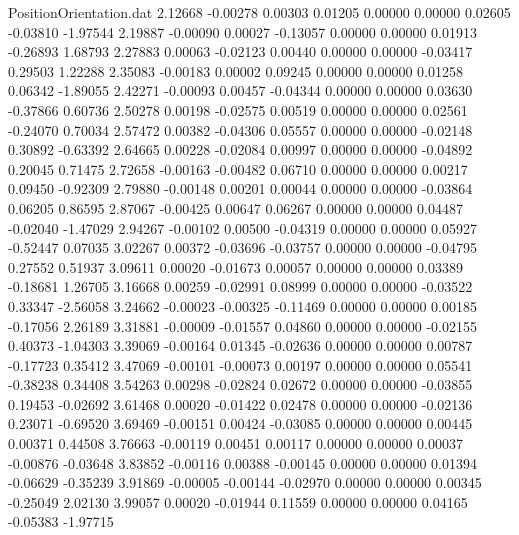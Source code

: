 \begin{filecontents}{PositionOrientation.dat}
   2.12668   -0.00278    0.00303     0.01205    0.00000    0.00000    0.02605   -0.03810   -1.97544
   2.19887   -0.00090    0.00027    -0.13057    0.00000    0.00000    0.01913   -0.26893    1.68793
   2.27883    0.00063   -0.02123     0.00440    0.00000    0.00000   -0.03417    0.29503    1.22288
   2.35083   -0.00183    0.00002     0.09245    0.00000    0.00000    0.01258    0.06342   -1.89055
   2.42271   -0.00093    0.00457    -0.04344    0.00000    0.00000    0.03630   -0.37866    0.60736
   2.50278    0.00198   -0.02575     0.00519    0.00000    0.00000    0.02561   -0.24070    0.70034
   2.57472    0.00382   -0.04306     0.05557    0.00000    0.00000   -0.02148    0.30892   -0.63392
   2.64665    0.00228   -0.02084     0.00997    0.00000    0.00000   -0.04892    0.20045    0.71475
   2.72658   -0.00163   -0.00482     0.06710    0.00000    0.00000    0.00217    0.09450   -0.92309
   2.79880   -0.00148    0.00201     0.00044    0.00000    0.00000   -0.03864    0.06205    0.86595
   2.87067   -0.00425    0.00647     0.06267    0.00000    0.00000    0.04487   -0.02040   -1.47029
   2.94267   -0.00102    0.00500    -0.04319    0.00000    0.00000    0.05927   -0.52447    0.07035
   3.02267    0.00372   -0.03696    -0.03757    0.00000    0.00000   -0.04795    0.27552    0.51937
   3.09611    0.00020   -0.01673     0.00057    0.00000    0.00000    0.03389   -0.18681    1.26705
   3.16668    0.00259   -0.02991     0.08999    0.00000    0.00000   -0.03522    0.33347   -2.56058
   3.24662   -0.00023   -0.00325    -0.11469    0.00000    0.00000    0.00185   -0.17056    2.26189
   3.31881   -0.00009   -0.01557     0.04860    0.00000    0.00000   -0.02155    0.40373   -1.04303
   3.39069   -0.00164    0.01345    -0.02636    0.00000    0.00000    0.00787   -0.17723    0.35412
   3.47069   -0.00101   -0.00073     0.00197    0.00000    0.00000    0.05541   -0.38238    0.34408
   3.54263    0.00298   -0.02824     0.02672    0.00000    0.00000   -0.03855    0.19453   -0.02692
   3.61468    0.00020   -0.01422     0.02478    0.00000    0.00000   -0.02136    0.23071   -0.69520
   3.69469   -0.00151    0.00424    -0.03085    0.00000    0.00000    0.00445    0.00371    0.44508
   3.76663   -0.00119    0.00451     0.00117    0.00000    0.00000    0.00037   -0.00876   -0.03648
   3.83852   -0.00116    0.00388    -0.00145    0.00000    0.00000    0.01394   -0.06629   -0.35239
   3.91869   -0.00005   -0.00144    -0.02970    0.00000    0.00000    0.00345   -0.25049    2.02130
   3.99057    0.00020   -0.01944     0.11559    0.00000    0.00000    0.04165   -0.05383   -1.97715

\end{filecontents}
